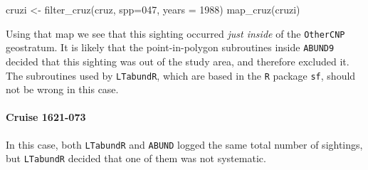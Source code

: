\documentclass[
]{book}
\newenvironment{Shaded}{\begin{snugshade}}{\end{snugshade}}
\newcommand{\AttributeTok}[1]{\textcolor[rgb]{0.77,0.63,0.00}{#1}}
\newcommand{\DecValTok}[1]{\textcolor[rgb]{0.00,0.00,0.81}{#1}}
\newcommand{\FunctionTok}[1]{\textcolor[rgb]{0.00,0.00,0.00}{#1}}
\newcommand{\NormalTok}[1]{#1}
\newcommand{\OtherTok}[1]{\textcolor[rgb]{0.56,0.35,0.01}{#1}}
\newcommand{\StringTok}[1]{\textcolor[rgb]{0.31,0.60,0.02}{#1}}
\begin{document}
\begin{Shaded}
\begin{Highlighting}[]
\NormalTok{cruzi }\OtherTok{\textless{}{-}} \FunctionTok{filter\_cruz}\NormalTok{(cruz, }\AttributeTok{spp=}\StringTok{\textquotesingle{}047\textquotesingle{}}\NormalTok{, }\AttributeTok{years =} \DecValTok{1988}\NormalTok{)}
\FunctionTok{map\_cruz}\NormalTok{(cruzi)}
\end{Highlighting}
\end{Shaded}

Using that map we see that this sighting occurred \emph{just inside} of the \texttt{OtherCNP} geostratum. It is likely that the point-in-polygon subroutines inside \texttt{ABUND9} decided that this sighting was out of the study area, and therefore excluded it. The subroutines used by \texttt{LTabundR}, which are based in the \texttt{R} package \texttt{sf}, should not be wrong in this case.

\hypertarget{cruise-1621-073}{%
\paragraph*{Cruise 1621-073}\label{cruise-1621-073}}

In this case, both \texttt{LTabundR} and \texttt{ABUND} logged the same total number of sightings, but \texttt{LTabundR} decided that one of them was not systematic.
\end{document}
